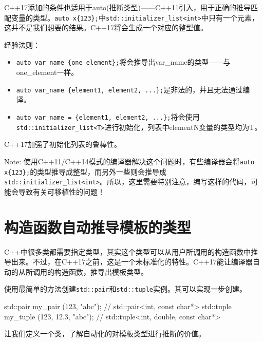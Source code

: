 C++17添加的条件也适用于auto(推断类型)——C++11引入，用于正确的推导匹配变量的类型。\texttt{auto x\{123\};}中\texttt{std::initializer\_list<int>}中只有一个元素，这并不是我们想要的结果。C++17将会生成一个对应的整型值。

经验法则：

\begin{itemize}
\item \texttt{auto var\_name \{one\_element\};}将会推导出var\_name的类型——与one\_element一样。

\item \texttt{auto var\_name \{element1, element2, ...\};}是非法的，并且无法通过编译。

\item \texttt{auto var\_name = \{element1, element2, ...\};}将会使用\texttt{std::initializer\_list<T>}进行初始化，列表中elementN变量的类型均为T。

\end{itemize}

C++17加强了初始化列表的鲁棒性。

\begin{myInfoBox}
Note: 使用C++11/C++14模式的编译器解决这个问题时，有些编译器会将\texttt{auto x\{123\};}的类型推导成整型，而另外一些则会推导成 \texttt{std::initializer\_list<int>}。所以，这里需要特别注意，编写这样的代码，可能会导致有关可移植性的问题！
\end{myInfoBox}


\section{构造函数自动推导模板的类型}

C++中很多类都需要指定类型，其实这个类型可以从用户所调用的构造函数中推导出来。不过，在C++17之前，这是一个未标准化的特性。C++17能让编译器自动的从所调用的构造函数，推导出模板类型。


使用最简单的方法创建\texttt{std::pair}和\texttt{std::tuple}实例。其可以实现一步创建。

\begin{codebox}[cpp]
std::pair my_pair (123, "abc"); // std::pair<int, const char*>
std::tuple my_tuple (123, 12.3, "abc"); // std::tuple<int, double, const char*>
\end{codebox}


让我们定义一个类，了解自动化的对模板类型进行推断的价值。

